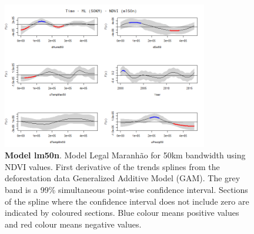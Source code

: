 \begin{table}

\begin{figure}[H]
 \centering
        \centering
        \includegraphics[width=0.8\textwidth]{ml50n.png} %
        \caption[Model Legal Maranhão for 50km bandwidth using NDVI values. First derivative of the trends splines from the deforestation data Generalized Additive Model (GAM)]{\textbf{Model lm50n}. Model Legal Maranhão for 50km bandwidth using NDVI values. First derivative of the trends splines from the deforestation data Generalized Additive Model (GAM). The grey band is a 99\% simultaneous point-wise confidence interval. Sections of the spline where the confidence interval does not include zero are indicated by coloured sections. Blue colour means positive values and red colour means negative values.}
        \centering
\end{figure}

\end{table}

